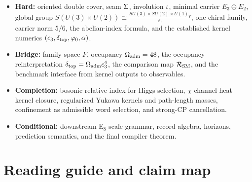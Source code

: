 \begin{tcolorbox}[colback=gray!5, colframe=gray!60, breakable,
    title={\textbf{Reading Status for the Present Paper}}, fonttitle=\bfseries]
\begin{itemize}[leftmargin=1.5em, topsep=3pt, itemsep=3pt]
    \item \textbf{Hard:} oriented double cover, seam $\Sigma$, involution $\iota$, minimal carrier $E_3\oplus E_2$, global group $S(U(3)\times U(2))\cong \frac{SU(3)\times SU(2)\times U(1)_Y}{\mathbb Z_6}$, one chiral family, carrier norm $5/6$, the abelian-index formula, and the established kernel numerics $(c_3,\delta_{\mathrm{top}},\varphi_0,\alpha)$.
    \item \textbf{Bridge:} family space $F$, occupancy $\Omega_{\mathrm{adm}}=48$, the occupancy reinterpretation $\delta_{\mathrm{top}}=\Omega_{\mathrm{adm}}c_3^4$, the comparison map $\mathcal R_{\mathrm{SM}}$, and the benchmark interface from kernel outputs to observables.
    \item \textbf{Completion:} bosonic relative index for Higgs selection, $\chi$-channel heat-kernel closure, regularized Yukawa kernels and path-length masses, confinement as admissible word selection, and strong-CP cancellation.
    \item \textbf{Conditional:} downstream E$_8$ scale grammar, record algebra, horizons, prediction semantics, and the final compiler theorem.
\end{itemize}
\end{tcolorbox}

\tableofcontents

\section{Reading guide and claim map}

